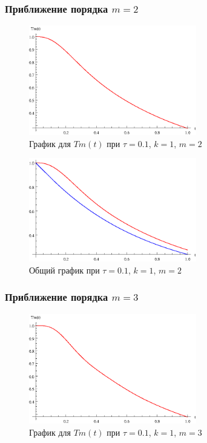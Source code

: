 \newpage

\subsubsection{Приближение порядка $m=2$}

\begin{figure}[h]
\begin{center}
\includegraphics[width=0.65\textwidth]{./3_results/1_4.eps}
\end{center}
\caption{График для $Tm(t)$ при $\tau=0.1$, $k=1$, $m=2$}
\end{figure}

\begin{figure}[h]
\begin{center}
\includegraphics[width=0.65\textwidth]{./3_results/1_5.eps}
\end{center}
\caption{Общий график при $\tau=0.1$, $k=1$, $m=2$}
\end{figure}

\newpage

\subsubsection{Приближение порядка $m=3$}

\begin{figure}[h]
\begin{center}
\includegraphics[width=0.65\textwidth]{./3_results/1_6.eps}
\end{center}
\caption{График для $Tm(t)$ при $\tau=0.1$, $k=1$, $m=3$}
\end{figure}

